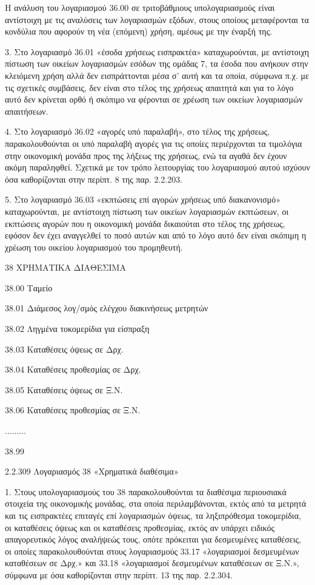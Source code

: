 \documentclass[A4,10pt,greek]{book}
\begin{document}
Η ανάλυση του λογαριασμού 36.00 σε τριτοβάθμιους υπολογαριασμούς είναι αντίστοιχη με τις αναλύσεις των λογαριασμών εξόδων, στους οποίους μεταφέρονται τα κονδύλια που αφορούν τη νέα (επόμενη) χρήση, αμέσως με την έναρξή της.

3. Στο λογαριασμό 36.01 «έσοδα χρήσεως εισπρακτέα» καταχωρούνται, με αντίστοιχη πίστωση των οικείων λογαριασμών εσόδων της ομάδας 7, τα έσοδα που ανήκουν στην κλειόμενη χρήση αλλά δεν εισπράττονται μέσα σ' αυτή και τα οποία, σύμφωνα π.χ.  με τις σχετικές συμβάσεις, δεν είναι στο τέλος της χρήσεως απαιτητά και για το λόγο αυτό δεν κρίνεται ορθό ή σκόπιμο να φέρονται σε χρέωση των οικείων λογαριασμών απαιτήσεων.

4. Στο λογαριασμό 36.02 «αγορές υπό παραλαβή», στο τέλος της χρήσεως, παρακολουθούνται οι υπό παραλαβή αγορές για τις οποίες περιέρχονται τα τιμολόγια στην οικονομική μονάδα προς της λήξεως της χρήσεως, ενώ τα αγαθά δεν έχουν ακόμη παραληφθεί. Σχετικά με τον τρόπο λειτουργίας του λογαριασμού αυτού ισχύουν όσα καθορίζονται στην περίπτ. 8 της παρ. 2.2.203.

5. Στο λογαριασμό 36.03 «εκπτώσεις επί αγορών χρήσεως υπό διακανονισμό» καταχωρούνται, με αντίστοιχη πίστωση των οικείων λογαριασμών εκπτώσεων, οι εκπτώσεις αγορών που η οικονομική μονάδα δικαιούται στο τέλος της χρήσεως, εφόσον δεν έχει αναγγελθεί το ποσό αυτών και από το λόγο αυτό δεν είναι σκόπιμη η χρέωση του οικείου λογαριασμού του προμηθευτή.

 38   ΧΡΗΜΑΤΙΚΑ ΔΙΑΘΕΣΙΜΑ

        38.00   Ταμείο

        38.01   Διάμεσος λογ/σμός ελέγχου διακινήσεως μετρητών

        38.02   Ληγμένα τοκομερίδια για είσπραξη

        38.03   Καταθέσεις όψεως σε Δρχ.

        38.04   Καταθέσεις προθεσμίας σε Δρχ.

        38.05   Καταθέσεις όψεως σε Ξ.Ν.

        38.06   Καταθέσεις προθεσμίας σε Ξ.Ν.

        .........

        38.99

 

2.2.309 Λογαριασμός 38 «Χρηματικά διαθέσιμα»

1. Στους υπολογαριασμούς του 38 παρακολουθούνται τα διαθέσιμα περιουσιακά στοιχεία της οικονομικής μονάδας, στα οποία περιλαμβάνονται, εκτός από τα μετρητά και τις εισπρακτέες επιταγές επί λογαριασμών όψεως, τα ληξιπρόθεσμα τοκομερίδια, οι καταθέσεις όψεως και οι καταθέσεις προθεσμίας, εκτός αν υπάρχει ειδικός απαγορευτικός λόγος αναλήψεώς τους, οπότε πρόκειται για δεσμευμένες καταθέσεις, οι οποίες παρακολουθούνται στους λογαριασμούς 33.17 «λογαριασμοί δεσμευμένων καταθέσεων σε Δρχ.» και 33.18 «λογαριασμοί δεσμευμένων καταθέσεων σε Ξ.Ν.», σύμφωνα με όσα καθορίζονται στην περίπτ. 13 της παρ. 2.2.304.
\end{document}
